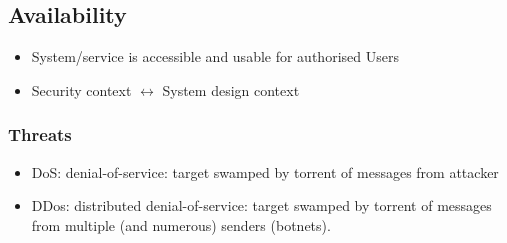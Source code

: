 \documentclass[11pt,british,faculty=ea,layout=titlefont,underline=false,titleUppercase=true,titleUnderline=true,hidelinks]{ugent2016-report}
\begin{document}
		\subsection{Availability} \label{sub:availability}
			\begin{itemize}
				\item System/service is accessible and usable for authorised Users
				\item Security context $\leftrightarrow$ System design context
			\end{itemize}
			\subsubsection{Threats} \label{subsub:availability-threats}
				\begin{itemize}
					\item DoS: denial-of-service: target swamped by torrent of messages from attacker
					\item DDos: distributed denial-of-service: target swamped by torrent of messages from multiple (and numerous) senders (botnets).
				\end{itemize}
\end{document}
